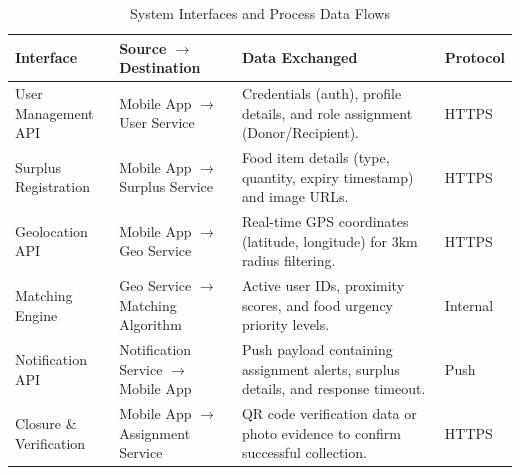 \documentclass{article}
\begin{document}
\begin{table}[H]
\centering
\caption{System Interfaces and Process Data Flows}
\label{tab:system_interfaces}
\begin{tabular}{@{}p{2.5cm}p{2.5cm}p{5.5cm}p{1.5cm}@{}}
\toprule
\textbf{Interface} & \textbf{Source $\rightarrow$ Destination} & \textbf{Data Exchanged} & \textbf{Protocol} \\
\midrule
User Management API & Mobile App $\rightarrow$ User Service & Credentials (auth), profile details, and role assignment (Donor/Recipient). & HTTPS \\
\midrule
Surplus Registration & Mobile App $\rightarrow$ Surplus Service & Food item details (type, quantity, expiry timestamp) and image URLs. & HTTPS \\
\midrule
Geolocation API & Mobile App $\rightarrow$ Geo Service & Real-time GPS coordinates (latitude, longitude) for 3km radius filtering. & HTTPS \\
\midrule
Matching Engine & Geo Service $\rightarrow$ Matching Algorithm & Active user IDs, proximity scores, and food urgency priority levels. & Internal \\
\midrule
Notification API & Notification Service $\rightarrow$ Mobile App & Push payload containing assignment alerts, surplus details, and response timeout. & Push \\
\midrule
Closure \& Verification & Mobile App $\rightarrow$ Assignment Service & QR code verification data or photo evidence to confirm successful collection. & HTTPS \\
\bottomrule
\end{tabular}
\end{table}
\end{document}
